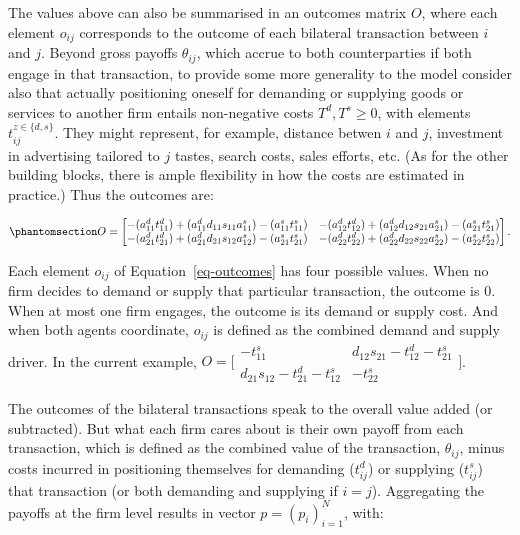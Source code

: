 \documentclass[
]{article}
\theoremstyle{definition}
\theoremstyle{plain}
\theoremstyle{remark}
\begin{document}
The values above can also be summarised in an outcomes matrix \(O\),
where each element \(o_{ij}\) corresponds to the outcome of each
bilateral transaction between \(i\) and \(j\). Beyond gross payoffs
\(\theta_{ij}\), which accrue to both counterparties if both engage in
that transaction, to provide some more generality to the model consider
also that actually positioning oneself for demanding or supplying goods
or services to another firm entails non-negative costs
\(T^d, T^s \geq 0\), with elements \(t_{ij}^{z \in \{d, s\}}\). They
might represent, for example, distance betwen \(i\) and \(j\),
investment in advertising tailored to \(j\) tastes, search costs, sales
efforts, etc. (As for the other building blocks, there is ample
flexibility in how the costs are estimated in practice.) Thus the
outcomes are:

\begin{equation}\phantomsection\label{eq-outcomes}{
O = 
\begin{bmatrix}
-(a_{11}^d t_{11}^d) + (a_{11}^d d_{11} s_{11} a_{11}^s) - (a_{11}^s t_{11}^s) & -(a_{12}^d t_{12}^d) + (a_{12}^d d_{12} s_{21} a_{21}^s) - (a_{21}^s t_{21}^s)\\
-(a_{21}^d t_{21}^d) + (a_{21}^d d_{21} s_{12} a_{12}^s) - (a_{21}^s t_{21}^s) & -(a_{22}^d t_{22}^d) + (a_{22}^d d_{22} s_{22} a_{22}^s) - (a_{22}^s t_{22}^s)
\end{bmatrix}.
}\end{equation}

Each element \(o_{ij}\) of Equation~\ref{eq-outcomes} has four possible
values. When no firm decides to demand or supply that particular
transaction, the outcome is \(0\). When at most one firm engages, the
outcome is its demand or supply cost. And when both agents coordinate,
\(o_{ij}\) is defined as the combined demand and supply driver. In the
current example, \(O=\big[\begin{smallmatrix}
-t_{11}^s & d_{12} s_{21} - t_{12}^d - t_{21}^s \\
d_{21} s_{12} -t_{21}^d - t_{12}^s & - t_{22}^s
\end{smallmatrix}\big]\).

The outcomes of the bilateral transactions speak to the overall value
added (or subtracted). But what each firm cares about is their own
payoff from each transaction, which is defined as the combined value of
the transaction, \(\theta_{ij}\), minus costs incurred in positioning
themselves for demanding (\(t_{ij}^d\)) or supplying (\(t_{ij}^s\)) that
transaction (or both demanding and supplying if \(i=j\)). Aggregating
the payoffs at the firm level results in vector \(p = (p_i)_{i=1}^N\),
with:
\end{document}
